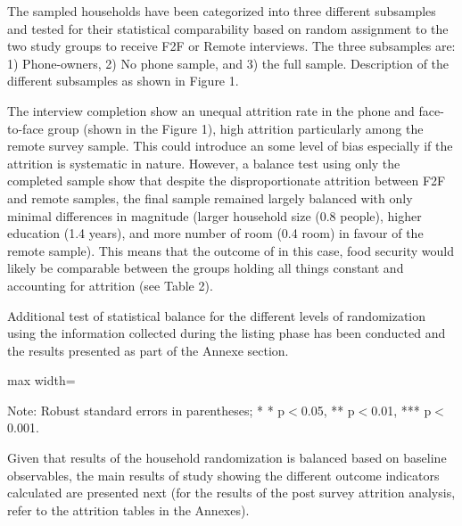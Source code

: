 \documentclass[11pt,harvard]{article}
\begin{document}
The sampled households have been categorized into three different subsamples and tested for their statistical comparability based on random assignment to the two study groups to receive F2F or Remote interviews. The three subsamples are: 1) Phone-owners, 2) No phone sample, and 3) the full sample. 
Description of the different subsamples as shown in Figure 1. 

The interview completion show an unequal attrition rate in the phone and face-to-face group (shown in the Figure 1), high attrition particularly among the remote survey sample. This could introduce an some level of bias especially if the attrition is systematic in nature. However, a balance test using only the completed sample show that despite the disproportionate attrition between F2F and remote samples, the final sample remained largely balanced with only minimal differences in magnitude (larger household size (0.8 people), higher education (1.4 years), and more number of room (0.4 room) in favour of the remote sample). This means that the outcome of in this case, food security would likely be comparable between the groups holding all things constant and accounting for attrition (see Table 2).

Additional test of statistical balance for the different levels of randomization using the information collected during the listing phase has been conducted and the results presented as part of the Annexe section.

 
\begin{table}[htbp]
	\centering
	\begin{adjustbox}{max width=\textwidth}
		\begin{threeparttable}
			\caption{Balance Table by Randomized Survey Modality: Face-to-Face vs. Remote for Completed Surveys}
			\scriptsize
			 
			\label{tab:CAR_Listing_Demo_Balance_Modality_Complete}
			\begin{tablenotes}
				\item Note: Robust standard errors in parentheses; * * p$<$0.05, ** p$<$0.01, *** p$<$0.001. 
			\end{tablenotes}
		\end{threeparttable}
	\end{adjustbox}
\end{table}

Given that results of the household randomization is balanced based on baseline observables, the main results of study showing the different outcome indicators calculated are presented next (for the results of the post survey attrition analysis, refer to the attrition tables in the Annexes). 
\end{document}
